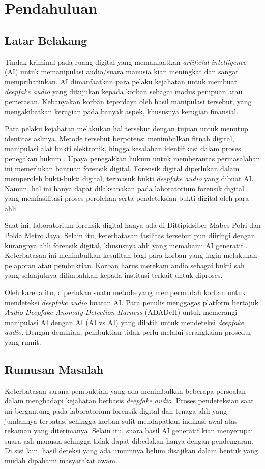 \cleardoublepage 
\chapter{Pendahuluan}
\label{chap:pendahuluan}

\section{Latar Belakang}
Tindak kriminal pada ruang digital yang memanfaatkan \textit{artificial intelligence} (AI) untuk memanipulasi audio/suara manusia kian meningkat dan sangat memprihatinkan. AI dimanfaatkan para pelaku kejahatan untuk membuat \textit{deepfake audio} yang ditujukan kepada korban sebagai modus penipuan atau pemerasan. Kebanyakan korban teperdaya oleh hasil manipulasi tersebut, yang mengakibatkan kerugian pada banyak aspek, khususnya kerugian finansial.

Para pelaku kejahatan melakukan hal tersebut dengan tujuan untuk menutup identitas aslinya. Metode tersebut berpotensi menimbulkan fitnah digital, manipulasi alat bukti elektronik, hingga kesalahan identifikasi dalam proses penegakan hukum \autocite{Iman_2026}. Upaya penegakkan hukum untuk memberantas permasalahan ini memerlukan bantuan forensik digital. Forensik digital diperlukan dalam memperoleh bukti-bukti digital, termasuk bukti \textit{deepfake audio} yang dibuat AI. Namun, hal ini hanya dapat dilaksanakan pada laboratorium forensik digital yang memfasilitasi proses perolehan serta pendeteksian bukti digital oleh para ahli.

Saat ini, laboratorium forensik digital hanya ada di Dittipidsiber Mabes Polri dan Polda Metro Jaya. Selain itu, keterbatasan fasilitas tersebut pun diiringi dengan kurangnya ahli forensik digital, khususnya ahli yang memahami AI generatif \autocite{SIP_Law_Firm_2025}. Keterbatasan ini menimbulkan kesulitan bagi para korban yang ingin melakukan pelaporan atau pembuktian. Korban harus merekam audio sebagai bukti sah yang selanjutnya dilimpahkan kepada institusi terkait untuk diproses.

Oleh karena itu, diperlukan suatu metode yang mempermudah korban untuk mendeteksi \textit{deepfake audio} buatan AI. Para penulis menggagas platform bertajuk \textit{Audio Deepfake Anomaly Detection Harness} (ADADeH) untuk memerangi manipulasi AI dengan AI (AI vs AI) yang dilatih untuk mendeteksi \textit{deepfake audio}. Dengan demikian, pembuktian tidak perlu melalui serangkaian prosedur yang rumit.

\section{Rumusan Masalah}
Keterbatasan sarana pembuktian yang ada menimbulkan beberapa persoalan dalam menghadapi kejahatan berbasis \textit{deepfake audio}. Proses pendeteksian saat ini bergantung pada laboratorium forensik digital dan tenaga ahli yang jumlahnya terbatas, sehingga korban sulit mendapatkan indikasi awal atas rekaman yang diterimanya. Selain itu, suara hasil AI generatif kian menyerupai suara asli manusia sehingga tidak dapat dibedakan hanya dengan pendengaran. Di sisi lain, hasil deteksi yang ada umumnya belum disajikan dalam bentuk yang mudah dipahami masyarakat awam.

